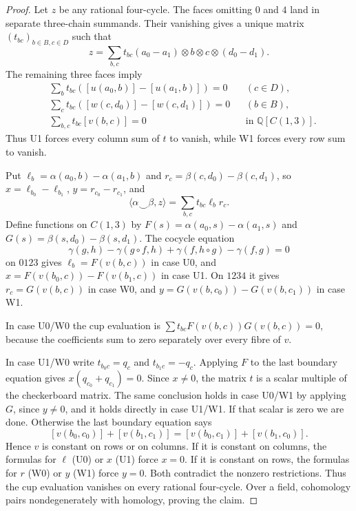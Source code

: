 \begin{proof}
Let $z$ be any rational four-cycle. The faces omitting $0$ and $4$
land in separate three-chain summands. Their vanishing gives a unique
matrix $(t_{bc})_{b\in B,c\in D}$ such that
\[
 z=\sum_{b,c}t_{bc}
 (a_0-a_1)\otimes b\otimes c\otimes(d_0-d_1).
\]
The remaining three faces imply
\begin{align*}
 &\sum_b t_{bc}([u(a_0,b)]-[u(a_1,b)])=0 &&(c\in D),\\
 &\sum_c t_{bc}([w(c,d_0)]-[w(c,d_1)])=0 &&(b\in B),\\
 &\sum_{b,c}t_{bc}[v(b,c)]=0 &&\text{in }\mathbb Q[C(1,3)].
\end{align*}
Thus U1 forces every column sum of $t$ to vanish, while W1 forces
every row sum to vanish.

Put $\ell_b=\alpha(a_0,b)-\alpha(a_1,b)$ and
$r_c=\beta(c,d_0)-\beta(c,d_1)$, so $x=\ell_{b_0}-\ell_{b_1}$,
$y=r_{c_0}-r_{c_1}$, and
\[
 \langle\alpha\smile\beta,z\rangle=\sum_{b,c}t_{bc}\ell_b r_c.
\]
Define functions on $C(1,3)$ by
$F(s)=\alpha(a_0,s)-\alpha(a_1,s)$ and
$G(s)=\beta(s,d_0)-\beta(s,d_1)$. The cocycle equation
\[
 \gamma(g,h)-\gamma(g\circ f,h)+\gamma(f,h\circ g)-\gamma(f,g)=0
\]
on $0123$ gives $\ell_b=F(v(b,c))$ in case U0, and
$x=F(v(b_0,c))-F(v(b_1,c))$ in case U1. On $1234$ it gives
$r_c=G(v(b,c))$ in case W0, and
$y=G(v(b,c_0))-G(v(b,c_1))$ in case W1.

In case U0/W0 the cup evaluation is
$\sum t_{bc}F(v(b,c))G(v(b,c))=0$, because the coefficients sum to
zero separately over every fibre of $v$.

In case U1/W0 write $t_{b_0c}=q_c$ and $t_{b_1c}=-q_c$.
Applying $F$ to the last boundary equation gives
$x(q_{c_0}+q_{c_1})=0$. Since $x\ne0$, the matrix $t$ is a scalar
multiple of the checkerboard matrix. The same conclusion holds
in case U0/W1 by applying $G$, since $y\ne0$, and it holds directly
in case U1/W1. If that scalar is zero we are done. Otherwise the
last boundary equation says
\[
 [v(b_0,c_0)]+[v(b_1,c_1)]
 =[v(b_0,c_1)]+[v(b_1,c_0)].
\]
Hence $v$ is constant on rows or on columns. If it is constant on
columns, the formulas for $\ell$ (U0) or $x$ (U1) force $x=0$.
If it is constant on rows, the formulas for $r$ (W0) or $y$ (W1)
force $y=0$. Both contradict the nonzero restrictions. Thus the
cup evaluation vanishes on every rational four-cycle. Over a field,
cohomology pairs nondegenerately with homology, proving the claim.
\end{proof}
